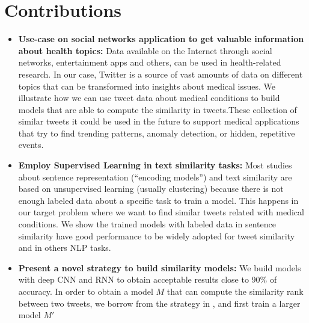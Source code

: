 \documentclass[12pt]{report}
\begin{document}
	\section{Contributions}
	\begin{itemize}[nolistsep]
		
		
		
		\item \textbf{Use-case on social networks application to get valuable information about health topics:}  Data available on the Internet through social networks, entertainment apps and others, can be used in health-related research. In our case,  Twitter is a source of vast amounts of data on different topics that can be transformed into insights about  medical issues. We illustrate  how we can use tweet data about medical conditions to build models that are able to compute the similarity in tweets.These collection of similar tweets  it could be used in the future to support medical applications that try to find trending patterns, 
		anomaly detection, or hidden, repetitive events. 
		\item \textbf{Employ Supervised Learning in text similarity tasks:} Most studies about sentence representation (``encoding models'') and text similarity are based on unsupervised learning (usually clustering) because there is not enough labeled data about a specific task to train a model. This happens in our target problem where we want to find similar tweets related with medical conditions. We show the trained models with labeled data in sentence similarity have good performance to be widely adopted for tweet similarity and in others \ac{NLP} tasks.
		\item \textbf{Present a novel strategy to build similarity models: } We build models with deep \ac{CNN} and \ac{RNN} to obtain acceptable results close to 90\% of accuracy. 
		In order to obtain a model $M$ that can compute the similarity rank between two tweets, we borrow from the strategy in \cite{Wang2014}, and first train a larger model $M'$

\end{itemize}
\end{document}
